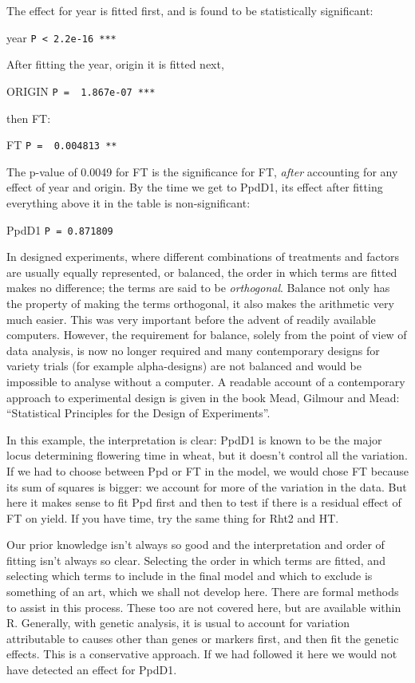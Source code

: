 \documentclass[
]{book}
\begin{document}
The effect for year is fitted first, and is found to be statistically significant:

year \texttt{P\ \textless{}\ 2.2e-16\ ***}

After fitting the year, origin it is fitted next,

ORIGIN \texttt{P\ =\ \ 1.867e-07\ ***}

then FT:

FT \texttt{P\ =\ \ 0.004813\ **}

The p-value of 0.0049 for FT is the significance for FT, \emph{after} accounting for any effect of year and origin. By the time we get to PpdD1, its effect after fitting everything above it in the table is non-significant:

PpdD1 \texttt{P\ =\ 0.871809}

In designed experiments, where different combinations of treatments and factors are usually equally represented, or balanced, the order in which terms are fitted makes no difference; the terms are said to be \emph{orthogonal}. Balance not only has the property of making the terms orthogonal, it also makes the arithmetic very much easier. This was very important before the advent of readily available computers. However, the requirement for balance, solely from the point of view of data analysis, is now no longer required and many contemporary designs for variety trials (for example alpha-designs) are not balanced and would be impossible to analyse without a computer. A readable account of a contemporary approach to experimental design is given in the book Mead, Gilmour and Mead: ``Statistical Principles for the Design of Experiments''.

In this example, the interpretation is clear: PpdD1 is known to be the major locus determining flowering time in wheat, but it doesn't control all the variation. If we had to choose between Ppd or FT in the model, we would chose FT because its sum of squares is bigger: we account for more of the variation in the data. But here it makes sense to fit Ppd first and then to test if there is a residual effect of FT on yield. If you have time, try the same thing for Rht2 and HT.

Our prior knowledge isn't always so good and the interpretation and order of fitting isn't always so clear. Selecting the order in which terms are fitted, and selecting which terms to include in the final model and which to exclude is something of an art, which we shall not develop here. There are formal methods to assist in this process. These too are not covered here, but are available within R. Generally, with genetic analysis, it is usual to account for variation attributable to causes other than genes or markers first, and then fit the genetic effects. This is a conservative approach. If we had followed it here we would not have detected an effect for PpdD1.
\end{document}
